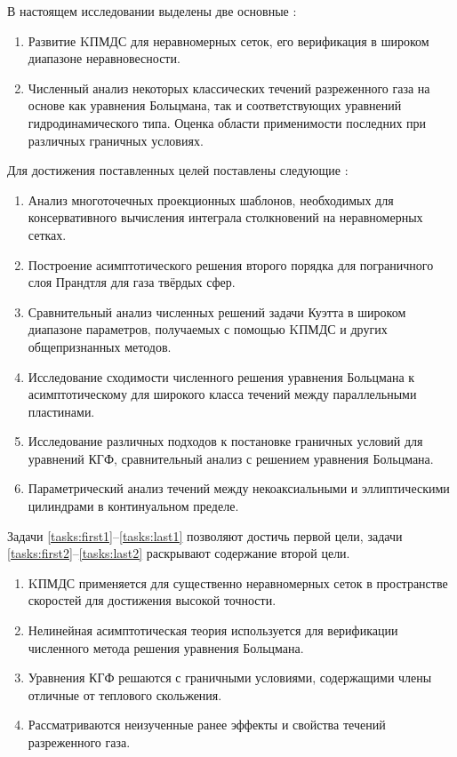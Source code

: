 В настоящем исследовании выделены две основные {\aim}:
\begin{enumerate}
    \item Развитие KПМДС для неравномерных сеток, его верификация в широком диапазоне неравновесности.
    \item Численный анализ некоторых классических течений разреженного газа на основе
    как уравнения Больцмана, так и соответствующих уравнений гидродинамического типа.
    Оценка области применимости последних при различных граничных условиях.
\end{enumerate}
Для достижения поставленных целей поставлены следующие {\tasks}:
\begin{enumerate}
    \item Анализ многоточечных проекционных шаблонов, необходимых для консервативного вычисления
    интеграла столкновений на неравномерных сетках.\label{tasks:first1}
    \item Построение асимптотического решения второго порядка
    для пограничного слоя Прандтля для газа твёрдых сфер. \label{tasks:first2}
    \item Сравнительный анализ численных решений задачи Куэтта в широком диапазоне параметров,
    получаемых с помощью KПМДС и других общепризнанных методов.
    \item Исследование сходимости численного решения уравнения Больцмана к асимптотическому
    для широкого класса течений между параллельными пластинами.
    \item Исследование различных подходов к постановке граничных условий для уравнений КГФ,
    сравнительный анализ с решением уравнения Больцмана.\label{tasks:last1}
    \item Параметрический анализ течений между некоаксиальными и эллиптическими цилиндрами
    в континуальном пределе.\label{tasks:last2}
\end{enumerate}
Задачи \ref{tasks:first1}--\ref{tasks:last1} позволяют достичь первой цели,
задачи \ref{tasks:first2}--\ref{tasks:last2} раскрывают содержание второй цели.

{\novelty}
\begin{enumerate}
    \item KПМДС применяется для существенно неравномерных сеток в пространстве скоростей для достижения высокой точности. %
    \item Нелинейная асимптотическая теория используется для верификации численного метода решения уравнения Больцмана. %
    \item Уравнения КГФ решаются с граничными условиями, содержащими члены отличные от теплового скольжения. %
    \item Рассматриваются неизученные ранее эффекты и свойства течений разреженного газа. %
\end{enumerate}

